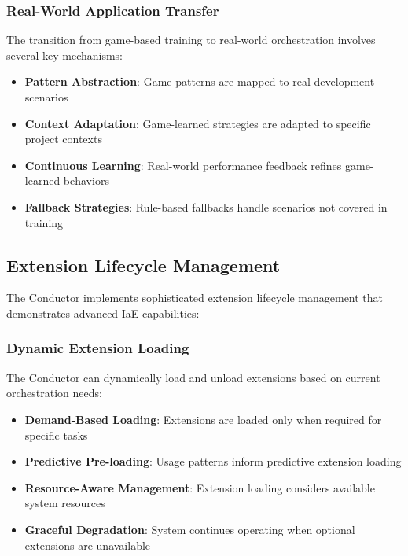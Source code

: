 \subsubsection{Real-World Application Transfer}

The transition from game-based training to real-world orchestration involves several key mechanisms:

\begin{itemize}
    \item \textbf{Pattern Abstraction}: Game patterns are mapped to real development scenarios
    \item \textbf{Context Adaptation}: Game-learned strategies are adapted to specific project contexts
    \item \textbf{Continuous Learning}: Real-world performance feedback refines game-learned behaviors
    \item \textbf{Fallback Strategies}: Rule-based fallbacks handle scenarios not covered in training
\end{itemize}

\subsection{Extension Lifecycle Management}

The Conductor implements sophisticated extension lifecycle management that demonstrates advanced IaE capabilities:

\subsubsection{Dynamic Extension Loading}

The Conductor can dynamically load and unload extensions based on current orchestration needs:

\begin{itemize}
    \item \textbf{Demand-Based Loading}: Extensions are loaded only when required for specific tasks
    \item \textbf{Predictive Pre-loading}: Usage patterns inform predictive extension loading
    \item \textbf{Resource-Aware Management}: Extension loading considers available system resources
    \item \textbf{Graceful Degradation}: System continues operating when optional extensions are unavailable
\end{itemize}

